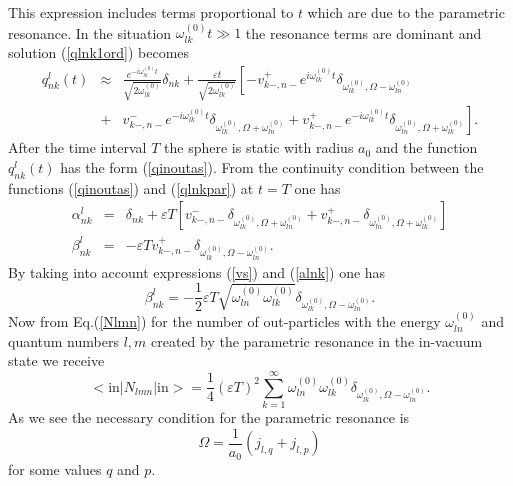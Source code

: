 \documentclass[a4paper,11pt]{article}
\begin{document}
This expression includes terms proportional to $t$ which are due to the
parametric resonance. In the situation $\omega _{lk}^{(0)}t\gg 1$ the
resonance terms are dominant and solution (\ref{qlnk1ord}) becomes
\begin{eqnarray}
q_{nk}^{l}(t) &\approx &\frac{e^{-i\omega _{lk}^{(0)}t}}{\sqrt{2\omega
_{lk}^{(0)}}}\delta _{nk}+\frac{\varepsilon t}{\sqrt{2\omega _{lk}^{(0)}}}%
\left[ -v_{k-,n-}^{+}e^{i\omega _{lk}^{(0)}t}\delta _{\omega
_{lk}^{(0)},\Omega -\omega _{ln}^{(0)}}\right.   \label{qlnkpar} \\
&+&\left. v_{k-,n-}^{-}e^{-i\omega _{lk}^{(0)}t}\delta _{\omega
_{lk}^{(0)},\Omega +\omega _{ln}^{(0)}}+v_{k-,n-}^{+}e^{-i\omega
_{lk}^{(0)}t}\delta _{\omega _{ln}^{(0)},\Omega +\omega _{lk}^{(0)}}\right] .
\nonumber
\end{eqnarray}
After the time interval $T$ the sphere is static with radius $a_{0}$ and the
function $q_{nk}^{l}(t)$ has the form (\ref{qinoutas}). From the continuity
condition between the functions (\ref{qinoutas}) and (\ref{qlnkpar}) at $t=T$
one has
\begin{eqnarray}
\alpha _{nk}^{l} &=&\delta _{nk}+\varepsilon T\left[ v_{k-,n-}^{-}\delta
_{\omega _{lk}^{(0)},\Omega +\omega _{ln}^{(0)}}+v_{k-,n-}^{+}\delta
_{\omega _{ln}^{(0)},\Omega +\omega _{lk}^{(0)}}\right]   \label{Bogalf} \\
\beta _{nk}^{l} &=&-\varepsilon Tv_{k-,n-}^{+}\delta _{\omega
_{lk}^{(0)},\Omega -\omega _{ln}^{(0)}}.  \label{Bogbet}
\end{eqnarray}
By taking into account expressions (\ref{vs}) and (\ref{alnk}) one
has
\begin{equation}
\beta _{nk}^{l}=-\frac{1}{2}\varepsilon T\sqrt{\omega _{ln}^{(0)}\omega
_{lk}^{(0)}}\delta _{\omega _{lk}^{(0)},\Omega -\omega _{ln}^{(0)}}.
\label{betparres}
\end{equation}
Now from Eq.(\ref{Nlmn}) for the number of out-particles with the energy $%
\omega _{ln}^{(0)}$ and quantum numbers $l,m$ created by the parametric
resonance in the in-vacuum state we receive
\begin{equation}
<{\mathrm{in}}|N_{lmn}|{\mathrm{in}}>=\frac{1}{4}(\varepsilon
T)^{2}\sum_{k=1}^{\infty }\omega _{ln}^{(0)}\omega _{lk}^{(0)}\delta
_{\omega _{lk}^{(0)},\Omega -\omega _{ln}^{(0)}}.  \label{Nlmn2}
\end{equation}
As we see the necessary condition for the parametric resonance is
\begin{equation}
\Omega =\frac{1}{a_{0}}\left( j_{l,q}+j_{l,p}\right)   \label{parrescond}
\end{equation}
for some values $q$ and $p$.
\end{document}
